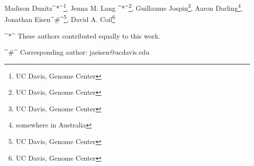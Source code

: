 Madison Dunitz^*^\footnote{UC Davis, Genome Center}, Jenna M. Lang ^*^\footnote{UC Davis, Genome Center}, Guillaume Jospin\footnote{UC Davis, Genome Center}, Aaron Darling\footnote{somewhere in Australia}, Jonathan Eisen^\#^\footnote{UC Davis, Genome Center}, David A. Coil\footnote{UC Davis, Genome Center} 

^*^ These authors contributed equally to this work.

^\#^ Corresponding author: jaeisen@ucdavis.edu